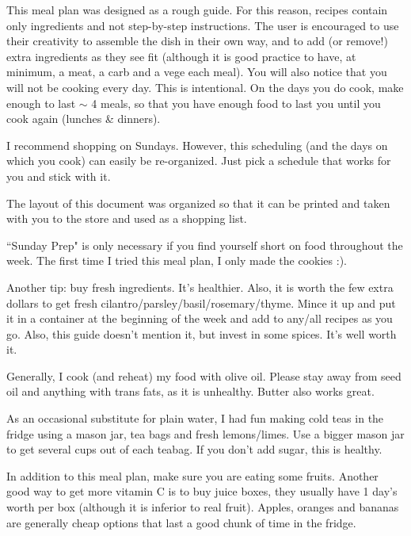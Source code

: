 \documentclass[11pt, a4paper]{article}
\begin{document}
This meal plan was designed as a rough guide. For this reason, recipes contain only ingredients and not step-by-step instructions. The user is encouraged to use their creativity to assemble the dish in their own way, and to add (or remove!) extra ingredients as they see fit (although it is good practice to have, at minimum, a meat, a carb and a vege each meal). You will also notice that you will not be cooking every day. This is intentional. On the days you do cook, make enough to last $\sim$ 4 meals, so that you have enough food to last you until you cook again (lunches \& dinners).
\par
I recommend shopping on Sundays. However, this scheduling (and the days on which you cook) can easily be re-organized. Just pick a schedule that works for you and stick with it.
\par
The layout of this document was organized so that it can be printed and taken with you to the store and used as a shopping list.
\par
``Sunday Prep" is only necessary if you find yourself short on food throughout the week. The first time I tried this meal plan, I only made the cookies :).
\par
Another tip: buy fresh ingredients. It's healthier. Also, it is worth the few extra dollars to get fresh cilantro/parsley/basil/rosemary/thyme. Mince it up and put it in a container at the beginning of the week and add to any/all recipes as you go. Also, this guide doesn't mention it, but invest in some spices. It's well worth it.
\par
Generally, I cook (and reheat) my food with olive oil. Please stay away from seed oil and anything with trans fats, as it is unhealthy. Butter also works great.
\par
As an occasional substitute for plain water, I had fun making cold teas in the fridge using a mason jar, tea bags and fresh lemons/limes. Use a bigger mason jar to get several cups out of each teabag. If you don't add sugar, this is healthy.
\par
In addition to this meal plan, make sure you are eating some fruits. Another good way to get more vitamin C is to buy juice boxes, they usually have 1 day's worth per box (although it is inferior to real fruit). Apples, oranges and bananas are generally cheap options that last a good chunk of time in the fridge.


\pagebreak
\tableofcontents

\end{document}
